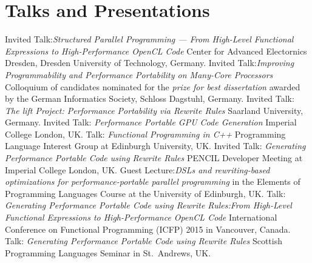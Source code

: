 \documentclass[11pt,a4paper]{moderncv}
\begin{document}
\section{Talks and Presentations}
         {Invited Talk:\newline \emph{Structured Parallel Programming --- From High-Level Functional Expressions to High-Performance OpenCL Code}\newline
         Center for Advanced Electornics Dresden, Dresden University of Technology, Germany.
         }
         {Invited Talk:\newline \emph{Improving Programmability and Performance Portability on Many-Core Processors}\newline
         \small Colloquium of candidates nominated for the \emph{prize for best dissertation} awarded by the German Informatics Society, Schloss Dagstuhl, Germany.}
         {Invited Talk: \emph{The lift Project: Performance Portability via Rewrite Rules}\newline
          Saarland University, Germany.}
         {Invited Talk: \emph{Performance Portable GPU Code Generation}\newline
         \small Imperial College London, UK.}
         {Talk: \emph{Functional Programming in C++}\newline
         \small Programming Language Interest Group at Edinburgh University, UK.}
         {Invited Talk: \emph{Generating Performance Portable Code using Rewrite Rules}\newline
         \small PENCIL Developer Meeting at Imperial College London, UK.}
         {Guest Lecture:\newline \emph{DSLs and rewriting-based optimizations for performance-portable parallel programming}\newline
         \small in the Elements of Programming Languages Course at the University of Edinburgh, UK.}
         {Talk: \emph{Generating Performance Portable Code using Rewrite Rules:\newline From High-Level Functional Expressions to High-Performance OpenCL Code}\newline
         \small International Conference on Functional Programming (ICFP) 2015 in Vancouver, Canada.}
         {Talk: \emph{Generating Performance Portable Code using Rewrite Rules}\newline
         \small Scottish Programming Languages Seminar in St.\ Andrews, UK.}
\end{document}
